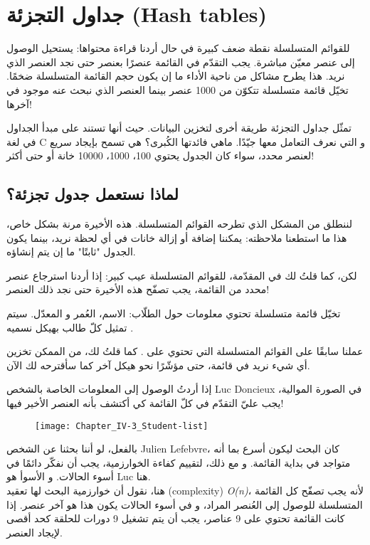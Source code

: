\chapter{جداول التجزئة (\textenglish{Hash tables})}

للقوائم المتسلسلة نقطة ضعف كبيرة في حال أردنا قراءة محتواها: يستحيل الوصول إلى عنصر معيّن مباشرة. يجب التقدّم في القائمة عنصرًا بعنصر حتى نجد العنصر الذي نريد. هذا يطرح مشاكل من ناحية الأداء ما إن يكون حجم القائمة المتسلسلة ضخمًا. تخيّل قائمة متسلسلة تتكوّن من 1000 عنصر بينما العنصر الذي نبحث عنه موجود في آخرها!

تمثّل جداول التجزئة طريقة أخرى لتخزين البيانات. حيث أنها تستند على مبدأ الجداول في لغة \textenglish{C}
و التي نعرف التعامل معها جيّدًا. ماهي فائدتها الكُبرى؟ هي تسمح بإيجاد سريع لعنصر محدد، سواء كان الجدول يحتوي 100، 1000، 10000 خانة أو حتى أكثر!

\section{لماذا نستعمل جدول تجزئة؟}

لننطلق من المشكل الذي تطرحه القوائم المتسلسلة. هذه الأخيرة مرنة بشكل خاص، هذا ما استطعنا ملاحظته: يمكننا إضافة أو إزالة خانات في أي لحظة نريد، بينما يكون الجدول "ثابتًا" ما إن يتم إنشاؤه.

لكن، كما قلتُ لك في المقدّمة، للقوائم المتسلسلة عيب كبير: إذا أردنا استرجاع عنصر محدد من القائمة، يجب تصفّح هذه الأخيرة حتى نجد ذلك العنصر!

تخيّل قائمة متسلسلة تحتوي معلومات حول الطلّاب: الاسم، العُمر و المعدّل. سيتم تمثيل كلّ طالب بهيكل نسميه
.

\begin{information}
عملنا سابقًا على القوائم المتسلسلة التي تحتوي على
.
 كما قلتُ لك، من الممكن تخزين أي شيء نريد في قائمة، حتى مؤشّرًا نحو هيكل آخر كما سأقترحه لك الآن.
\end{information}

 إذا أردتُ الوصول إلى المعلومات الخاصة بالشخص
\textenglish{Luc Doncieux}
 في الصورة الموالية، يجب عليّ التقدّم في كلّ القائمة كي أكتشف بأنه العنصر الأخير فيها!
 
\begin{figure}[H]
	\centering
	\texttt{[image: Chapter\_IV-3\_Student-list]}
\end{figure}

\begin{information}
بالفعل، لو أننا بحثنا عن الشخص 
\textenglish{Julien Lefebvre}،
كان البحث ليكون أسرع بما أنه متواجد في بداية القائمة. و مع ذلك، لتقييم كفاءة الخوارزمية، يجب أن نفكّر دائمًا في أسوء الحالات. و الأسوأ هو
\textenglish{Luc}
هنا.\\
هنا، نقول أن خوارزمية البحث لها تعقيد
(\textenglish{complexity})
\textit{\textenglish{O(n)}}،
لأنه يجب تصفّح كل القائمة المتسلسلة للوصول إلى العُنصر المراد، و في أسوء الحالات يكون هذا هو آخر عنصر. إذا كانت القائمة تحتوي على 9 عناصر، يجب أن يتم تشغيل 9 دورات للحلقة كحد أقصى لإيجاد العنصر.
\end{information}

